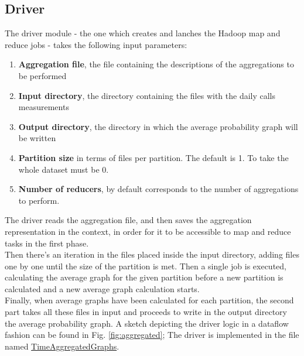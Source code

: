 \subsection{Driver}
The driver module - the one which creates and lanches the Hadoop
map and reduce jobs - takes the following input parameters:
\begin{enumerate}
\item \textbf{Aggregation file}, the file containing the descriptions of the aggregations to be performed
\item \textbf{Input directory}, the directory containing the files with the daily calls measurements
\item \textbf{Output directory}, the directory in which the average probability graph will be written
\item \textbf{Partition size} in terms of files per partition. The default is 1. To take the whole dataset must be 0.
\item \textbf{Number of reducers}, by default corresponds to the number of aggregations to perform.
\end{enumerate}
The driver reads the aggregation file, and then saves the aggregation representation in the context, in order for it to be accessible to map and reduce tasks in the first phase.\\
Then there's an iteration in the files placed inside the input directory, adding files one by one until the size of the partition is met.
Then a single job is executed, calculating the average graph for the given partition before a new partition is calculated and a new average graph calculation starts. \\
Finally, when average graphs have been calculated for each partition, the second part takes all these files in input and proceeds to write in the output directory the average probability graph.
A sketch depicting the driver logic in a dataflow fashion can be found in Fig. \ref{fig:aggregated};
The driver is implemented in the file named 
\href{https://github.com/michele-carignani/hadoop-markov-clustering/blob/master/src/aggregation/TimeAggregatedGraphs.java}{TimeAggregatedGraphs}.

\newpage